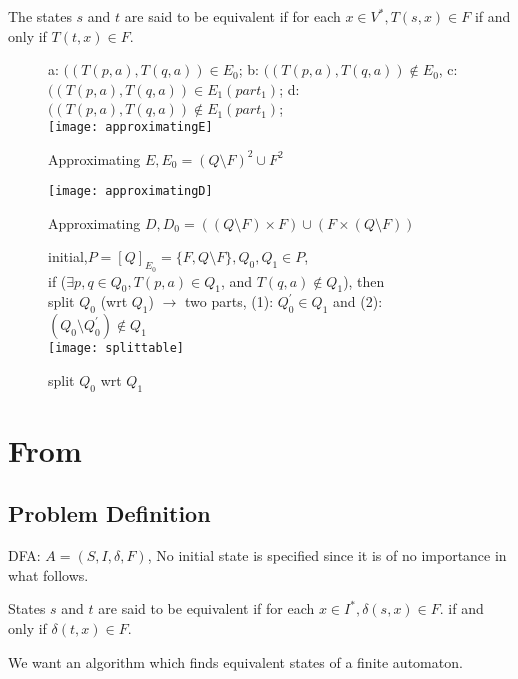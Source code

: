 \begin{definition}
	The states $s$ and $t$ are said to be equivalent if for each $x\in V^\ast, T(s,x)\in F$ if and only if $T(t,x)\in F$. 
\end{definition}

\begin{figure}[htbp]
	a: $((T(p,a),T(q,a))\in E_0$; b: $((T(p,a),T(q,a))\notin E_0$, c: $((T(p,a),T(q,a))\in E_1(part_1)$; d: $((T(p,a),T(q,a))\notin E_1(part_1)$;\\
	\texttt{[image: approximatingE]}
	\caption{Approximating $E, E_0=(Q\setminus F)^2\cup F^2$ }
\end{figure}

\begin{figure}[htbp]
	\texttt{[image: approximatingD]}
	\caption{Approximating $D, D_0=((Q\setminus F)\times F)\cup (F\times (Q\setminus F))$ }
\end{figure}

\begin{figure}[htbp]
	initial,$P=[Q]_{E_0}=\{F,Q\setminus F\},Q_0,Q_1\in P$, \\
	if ($\exists p,q\in Q_0,T(p,a)\in Q_1$, and  $T(q,a)\notin Q_1$), then \\
	split $Q_0$ (wrt $Q_1$) $\to$ two parts, (1): $Q_0^\prime\in Q_1$ and (2): $(Q_0\setminus Q_0^\prime)\notin Q_1$ \\
	\texttt{[image: splittable]}
	\caption{split $Q_0$ wrt $Q_1$ }
\end{figure}

\section{From \cite{Gries73}}

\subsection{Problem Definition}

DFA: $A=(S,I,\delta,F)$, No initial state is specified since it is of no importance in what follows.

\begin{definition}
	States $s$ and $t$ are said to be equivalent if for each $x\in I^\ast,\delta(s,x)\in F$. if and only if $\delta(t,x)\in F$.
\end{definition}

We want an algorithm which finds equivalent states of a finite automaton.

